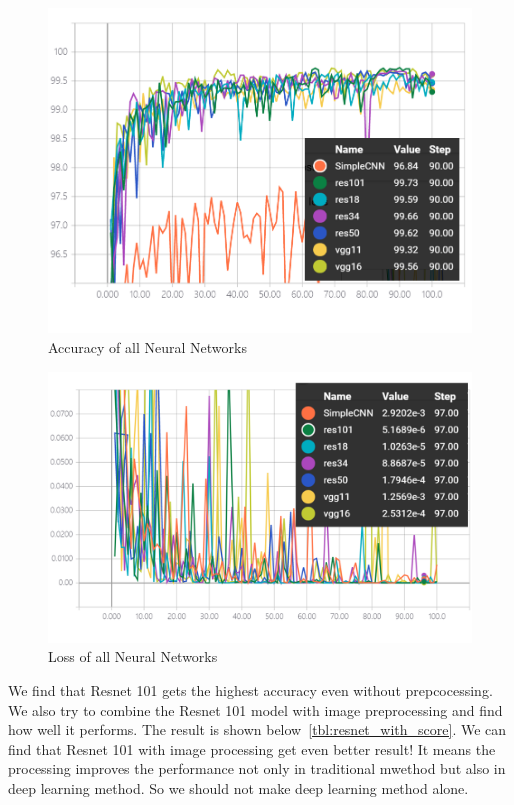 \documentclass{article}
\begin{document}
\begin{figure}[!htb]
	\centering\includegraphics[width=\textwidth]{fig/acc-total.png}
	\caption{Accuracy of all Neural Networks}\label{fig:acc-total}
\end{figure}

\begin{figure}[!htb]
	\centering\includegraphics[width=\textwidth]{fig/loss-total.png}
	\caption{Loss of all Neural Networks}\label{fig:loss-total}
\end{figure}

 We find that Resnet 101 gets the highest accuracy even without prepcocessing. We also try to combine the Resnet 101 model with image preprocessing and find how well it performs. The result is shown below~\ref{tbl:resnet_with_score}. We can find that Resnet 101 with image processing get even better result! It means the processing improves the performance not only in traditional mwethod but also in deep learning method. So we should not make deep learning method alone.
 
\end{document}
